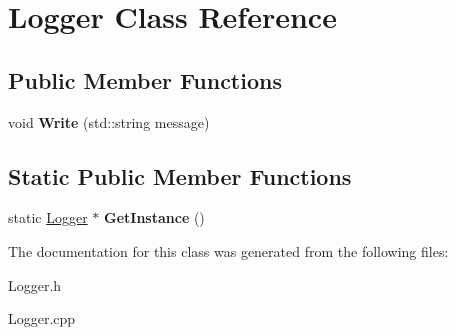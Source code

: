 \hypertarget{class_logger}{\section{Logger Class Reference}
\label{class_logger}
}
\subsection*{Public Member Functions}
\begin{DoxyCompactItemize}
\item 
\hypertarget{class_logger_af0d7273d6c812cb94851885c38bd9415}{void {\bfseries Write} (std\-::string message)}\label{class_logger_af0d7273d6c812cb94851885c38bd9415}

\end{DoxyCompactItemize}
\subsection*{Static Public Member Functions}
\begin{DoxyCompactItemize}
\item 
\hypertarget{class_logger_a58ba0fb326628410e7d67fe18d2e1fbf}{static \hyperlink{class_logger}{Logger} $\ast$ {\bfseries Get\-Instance} ()}\label{class_logger_a58ba0fb326628410e7d67fe18d2e1fbf}

\end{DoxyCompactItemize}


The documentation for this class was generated from the following files\-:\begin{DoxyCompactItemize}
\item 
Logger.\-h\item 
Logger.\-cpp\end{DoxyCompactItemize}
